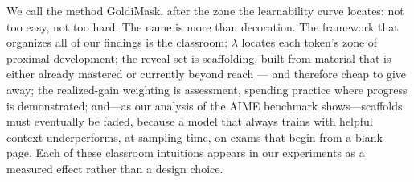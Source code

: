 \documentclass{article} %
\begin{document}
We call the method GoldiMask, after the zone the learnability curve locates: not too easy, not too hard. The name is more than decoration. The framework that organizes all of our findings is the classroom: $\lambda$ locates each token's zone of proximal development; the reveal set is scaffolding, built from material that is either already mastered or currently beyond reach --- and therefore cheap to give away; the realized-gain weighting is assessment, spending practice where progress is demonstrated; and---as our analysis of the AIME benchmark shows---scaffolds must eventually be faded, because a model that always trains with helpful context underperforms, at sampling time, on exams that begin from a blank page. Each of these classroom intuitions appears in our experiments as a measured effect rather than a design choice.
\end{document}
